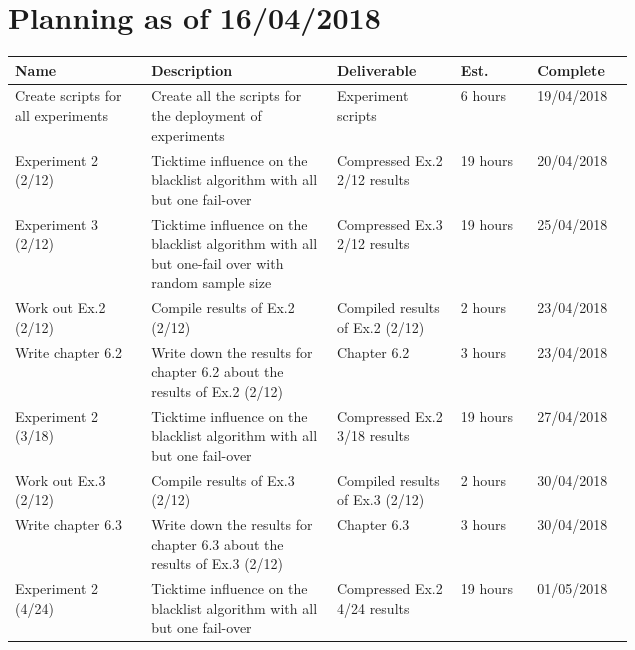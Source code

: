 
%

\section{Planning as of 16/04/2018}
\begin{longtable}{| p{0.22\linewidth} | p{0.3\linewidth}| p{0.2\linewidth} | l | l |}
\hline
\textbf{Name} & \textbf{Description} & \textbf{Deliverable} & \textbf{Est.} & \textbf{Complete} \\ \hline

Create scripts for all experiments & Create all the scripts for the deployment of experiments & Experiment scripts & 6 hours & 19/04/2018 \\
\hline

Experiment 2 (2/12) & Ticktime influence on the blacklist algorithm with all but one fail-over & Compressed Ex.2 2/12 results & 19 hours & 20/04/2018 \\
\hline

Experiment 3 (2/12) & Ticktime influence on the blacklist algorithm with all but one-fail over with random sample size & Compressed Ex.3 2/12 results & 19 hours & 25/04/2018 \\
\hline

Work out Ex.2 (2/12) & Compile results of Ex.2 (2/12) & Compiled results of Ex.2 (2/12) & 2 hours & 23/04/2018 \\
\hline 

Write chapter 6.2 & Write down the results for chapter 6.2 about the results of Ex.2 (2/12) & Chapter 6.2 & 3 hours & 23/04/2018 \\
\hline

Experiment 2 (3/18) & Ticktime influence on the blacklist algorithm with all but one fail-over & Compressed Ex.2 3/18 results & 19 hours & 27/04/2018 \\
\hline

Work out Ex.3 (2/12) & Compile results of Ex.3 (2/12) & Compiled results of Ex.3 (2/12) & 2 hours & 30/04/2018 \\
\hline

Write chapter 6.3 & Write down the results for chapter 6.3 about the results of Ex.3 (2/12) & Chapter 6.3 & 3 hours & 30/04/2018 \\
\hline

Experiment 2 (4/24) & Ticktime influence on the blacklist algorithm with all but one fail-over & Compressed Ex.2 4/24 results & 19 hours & 01/05/2018 \\
\hline


\end{longtable}
